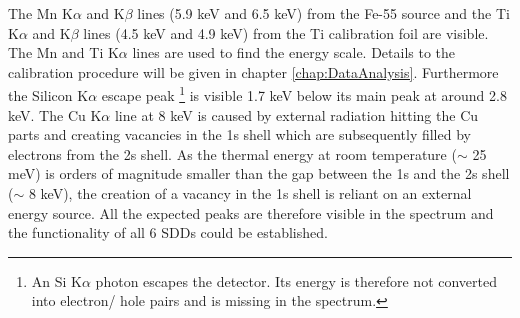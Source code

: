 The Mn K$\alpha$ and K$\beta$ lines (5.9 keV and 6.5 keV) from the Fe-55 source and the Ti K$\alpha$ and K$\beta$ lines (4.5 keV and 4.9 keV) from the Ti calibration foil are visible. The Mn and Ti K$\alpha$ lines are used to find the energy scale. Details to the calibration procedure will be given in chapter \ref{chap:DataAnalysis}. Furthermore the Silicon K$\alpha$ escape peak \footnote{An Si K$\alpha$ photon escapes the detector. Its energy is therefore not converted into electron/ hole pairs and is missing in the spectrum. } is visible 1.7 keV below its main peak at around 2.8 keV. The Cu K$\alpha$ line at 8 keV is caused by external radiation hitting the Cu parts and creating vacancies in the 1s shell which are subsequently filled by electrons from the 2s shell. As the thermal energy at room temperature ($\sim$ 25 meV) is orders of magnitude smaller than the gap between the 1s and the 2s shell ($\sim$ 8 keV), the creation of a vacancy in the 1s shell is reliant on an external energy source. All the expected peaks are therefore visible in the spectrum and the functionality of all 6 SDDs could be established.

